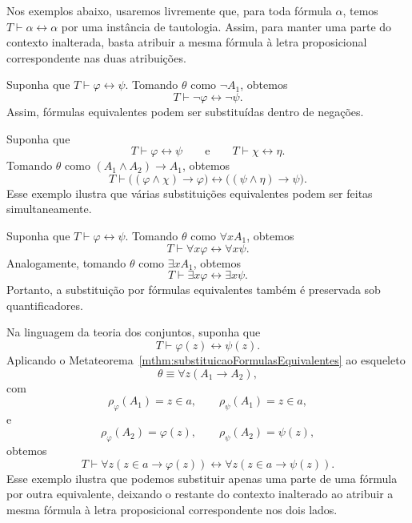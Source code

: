 Nos exemplos abaixo, usaremos livremente que, para toda fórmula $\alpha$, temos $T\vdash \alpha\leftrightarrow\alpha$ por uma instância de tautologia.
Assim, para manter uma parte do contexto inalterada, basta atribuir a mesma fórmula à letra proposicional correspondente nas duas atribuições.

\begin{example}
    Suponha que $T\vdash \varphi\leftrightarrow\psi$.
    Tomando $\theta$ como $\neg A_1$, obtemos
    \[
        T\vdash \neg\varphi\leftrightarrow\neg\psi.
    \]
    Assim, fórmulas equivalentes podem ser substituídas dentro de negações.
\end{example}

\begin{example}
    Suponha que
    \[
        T\vdash \varphi\leftrightarrow\psi
        \qquad\text{e}\qquad
        T\vdash \chi\leftrightarrow\eta.
    \]
    Tomando $\theta$ como $(A_1\wedge A_2)\rightarrow A_1$, obtemos
    \[
        T\vdash
        \bigl((\varphi\wedge\chi)\rightarrow\varphi\bigr)
        \leftrightarrow
        \bigl((\psi\wedge\eta)\rightarrow\psi\bigr).
    \]
    Esse exemplo ilustra que várias substituições equivalentes podem ser feitas simultaneamente.
\end{example}

\begin{example}
    Suponha que $T\vdash \varphi\leftrightarrow\psi$.
    Tomando $\theta$ como $\forall x A_1$, obtemos
    \[
        T\vdash \forall x\varphi\leftrightarrow\forall x\psi.
    \]
    Analogamente, tomando $\theta$ como $\exists x A_1$, obtemos
    \[
        T\vdash \exists x\varphi\leftrightarrow\exists x\psi.
    \]
    Portanto, a substituição por fórmulas equivalentes também é preservada sob quantificadores.
\end{example}

\begin{example}
    Na linguagem da teoria dos conjuntos, suponha que
    \[
        T\vdash \varphi(z)\leftrightarrow\psi(z).
    \]
    Aplicando o Metateorema~\ref{mthm:substituicaoFormulasEquivalentes} ao esqueleto
    \[
        \theta \equiv \forall z(A_1\rightarrow A_2),
    \]
    com
    \[
        \rho_\varphi(A_1)=z\in a,\qquad
        \rho_\psi(A_1)=z\in a,
    \]
    e
    \[
        \rho_\varphi(A_2)=\varphi(z),\qquad
        \rho_\psi(A_2)=\psi(z),
    \]
    obtemos
    \[
        T\vdash
        \forall z(z\in a\rightarrow\varphi(z))
        \leftrightarrow
        \forall z(z\in a\rightarrow\psi(z)).
    \]
    Esse exemplo ilustra que podemos substituir apenas uma parte de uma fórmula por outra equivalente, deixando o restante do contexto inalterado ao atribuir a mesma fórmula à letra proposicional correspondente nos dois lados.
\end{example}

